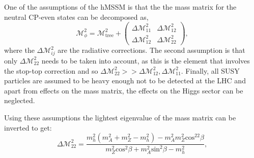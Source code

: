 One of the assumptions of the hMSSM is that the
the mass matrix for the neutral CP-even states can
be decomposed as,
\begin{equation}
\label{eqn:hmssm_massmatrix}
\mathcal{M}^2_{\phi} = \mathcal{M}^2_{\text{tree}} + \begin{pmatrix}
\Delta\mathcal{M}^2_{11} & \Delta\mathcal{M}^2_{12} \\
\Delta\mathcal{M}^2_{12} & \Delta\mathcal{M}^2_{22} \end{pmatrix},
\end{equation}
where the $\Delta\mathcal{M}^2_{ij}$ are the radiative corrections.
The second assumption is that only $\Delta\mathcal{M}^2_{22}$ needs to be
taken into account, as this is the element that involves the stop-top correction
and so $\Delta\mathcal{M}^2_{22} >> \Delta\mathcal{M}^2_{12},\Delta\mathcal{M}^2_{11}$. 
Finally, all SUSY particles are assumed to be heavy enough not to be
detected at the \acs{LHC} and apart from effects on the mass matrix, 
the effects on the Higgs sector can be neglected.

Using these assumptions the lightest eigenvalue
of the mass matrix can be inverted to get: 
\begin{equation}
\label{eqn:hmssm_deltam22}
\Delta\mathcal{M}^2_{22} = \frac{m_h^2(m_A^2+m_Z^2 - m_h^2) - m_A^2m_Z^2\text{cos}^22\beta}{m_Z^2\text{cos}^2\beta + m_A^2\text{sin}^2\beta - m_h^2},
\end{equation}

